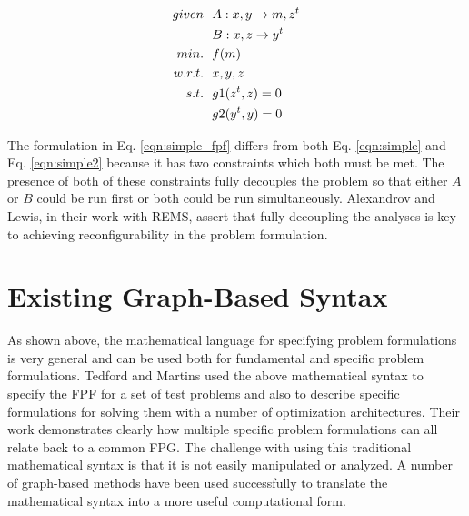     \begin{align}
        given & \ \ A: {x,y} \rightarrow {m,z^t} \notag
        \\      & \ \ B: {x,z} \rightarrow {y^t} \notag
        \\min. &\ \ f(m) \notag
        \\w.r.t. & \ \ x,y,z \notag
        \\s.t. & \ \ g1(z^t,z) = 0 \notag
        \\     & \ \ g2(y^t,y) = 0
        \label{eqn:simple_fpf}
    \end{align}

    The formulation in Eq. \ref{eqn:simple_fpf} differs from both Eq. \ref{eqn:simple} 
    and Eq. \ref{eqn:simple2} because it has two constraints which both must be 
    met. The presence of both of these constraints fully decouples the problem so that 
    either $A$ or $B$ could be run first or both could be run simultaneously. 
    Alexandrov and Lewis, in their work with REMS, assert that fully decoupling 
    the analyses is key to achieving reconfigurability in the problem 
    formulation\cite{alexandrov2004}.


\section{Existing Graph-Based Syntax}

    As shown above, the mathematical language for specifying problem formulations is very general and can be used both for 
    fundamental and specific problem formulations. Tedford and Martins used the above mathematical syntax to specify the 
    FPF for a set of test problems and also to describe specific formulations for solving them with a 
    number of optimization architectures\cite{Tedford2009}. Their work demonstrates clearly how multiple specific 
    problem formulations can all relate back to a common FPG. The challenge with using this 
    traditional mathematical syntax is that it is not easily manipulated or analyzed. 
    A number of graph-based methods have been used successfully to translate the 
    mathematical syntax into a more useful computational form. 
    
